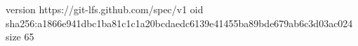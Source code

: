 version https://git-lfs.github.com/spec/v1
oid sha256:a1866e941dbc1ba81c1c1a20bcdaedc6139e41455ba89bde679ab6c3d03ac024
size 65
